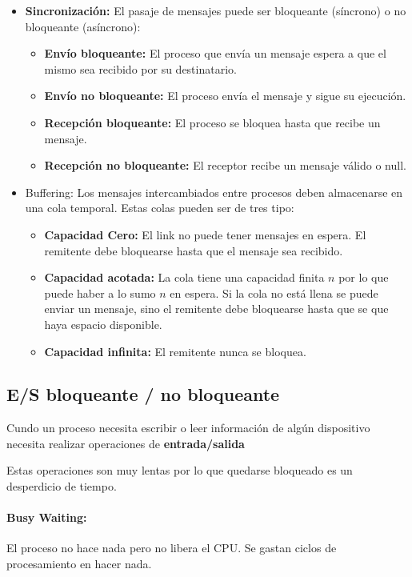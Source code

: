 \begin{itemize}
\begin{itemize}
	\end{itemize}
	\item \textbf{Sincronización:} El pasaje de mensajes puede ser bloqueante (síncrono) o no bloqueante (asíncrono):
	\begin{itemize}
		\item \textbf{Envío bloqueante:} El proceso que envía un mensaje espera a que el mismo sea recibido por su destinatario.
		\item \textbf{Envío no bloqueante:} El proceso envía el mensaje y sigue su ejecución.
		\item \textbf{Recepción bloqueante:} El proceso se bloquea hasta que recibe un mensaje.
		\item\textbf{Recepción no bloqueante:} El receptor recibe un mensaje válido o null.
	\end{itemize}
	\item Buffering: Los mensajes intercambiados entre procesos deben almacenarse en una cola temporal. Estas colas pueden ser de tres tipo:
	\begin{itemize}
		\item\textbf{Capacidad Cero:} El link no puede tener mensajes en espera. El remitente debe bloquearse hasta que el mensaje sea recibido.
		\item \textbf{Capacidad acotada:} La cola tiene una capacidad finita $n$ por lo que puede haber a lo sumo $n$ en espera. Si la cola no está llena se puede enviar un mensaje, sino el remitente debe bloquearse hasta que se que haya espacio disponible.
		\item \textbf{Capacidad infinita:} El remitente nunca se bloquea.
	\end{itemize}
\end{itemize}

\subsubsection{}

\subsection{E/S bloqueante / no bloqueante}
	Cundo un proceso necesita escribir o leer información de algún dispositivo necesita realizar operaciones de \textbf{entrada/salida}

	Estas operaciones son muy lentas por lo que quedarse bloqueado es un desperdicio de tiempo.

	\paragraph{Busy Waiting:} El proceso no hace nada pero no libera el CPU. Se gastan ciclos de procesamiento en hacer nada.

